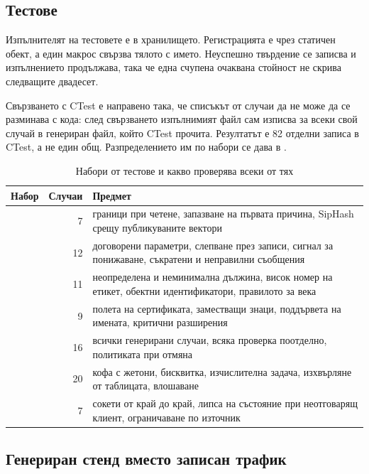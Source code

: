 \subsection{Тестове}
\label{subsec:tests}

Изпълнителят на тестовете е в хранилището. Регистрацията е чрез статичен обект, а един
макрос  свързва тялото с името. Неуспешно твърдение се записва и
изпълнението продължава, така че една счупена очаквана стойност не скрива следващите
двадесет.

Свързването с CTest е направено така, че списъкът от случаи да не може да се разминава с
кода: след свързването изпълнимият файл сам изписва  за всеки свой случай в
генериран файл, който CTest прочита. Резултатът е 82 отделни записа в CTest, а не един общ.
Разпределението им по набори се дава в .

\begin{table}[H]
\caption{Набори от тестове и какво проверява всеки от тях}
\label{tab:tests}
\centering
\fontsize{11}{13}\selectfont
\begin{tabular}{L{3.4cm} r L{7.4cm}}
\toprule
Набор & Случаи & Предмет \\
\midrule
{} & 7 & граници при четене, запазване на първата причина, SipHash срещу публикуваните вектори \\
 & 12 & договорени параметри, слепване през записи, сигнал за понижаване, съкратени и неправилни съобщения \\
 & 11 & неопределена и неминимална дължина, висок номер на етикет, обектни идентификатори, правилото за века \\
 & 9 & полета на сертификата, заместващи знаци, поддървета на имената, критични разширения \\
 & 16 & всички генерирани случаи, всяка проверка поотделно, политиката при отмяна \\
 & 20 & кофа с жетони, бисквитка, изчислителна задача, изхвърляне от таблицата, влошаване \\
 & 7 & сокети от край до край, липса на състояние при неотговарящ клиент, ограничаване по източник \\
\bottomrule
\end{tabular}
\end{table}

\subsection{Генериран стенд вместо записан трафик}
\label{subsec:impl_fixtures}

